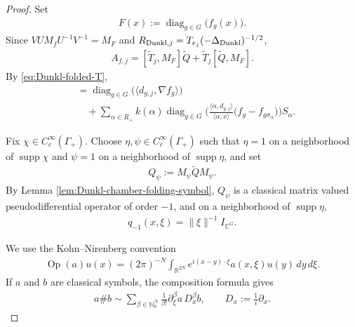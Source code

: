 \documentclass{amsart}
\begin{document}
\begin{proof}
Set
\begin{align*}
F(x)
:=
\operatorname{diag}_{g\in G}\big(f_g(x)\big).
\end{align*}
Since \(VU M_fU^{-1}V^{-1}=M_F\) and
\(R_{{\rm Dunkl},j}=T_{e_j}(-\Delta_{{\rm Dunkl}})^{-1/2}\),
\begin{align}
A_{f,j}
=
[\widetilde T_j,M_F]\widetilde Q
+
\widetilde T_j[\widetilde Q,M_F].
\label{eq:Dunkl-commutator-folded-decomposition}
\end{align}
By \eqref{eq:Dunkl-folded-T},
\begin{align}
[\widetilde T_j,M_F]
&=
\operatorname{diag}_{g\in G}
\big(
\langle d_{g,j},\nabla f_g\rangle
\big)
\nonumber\\
&\quad+
\sum_{\alpha\in R_+}
k(\alpha)
\operatorname{diag}_{g\in G}
\bigg(
\frac{\langle\alpha,d_{g,j}\rangle}
{\langle\alpha,x\rangle}
\big(
f_g-f_{g\sigma_\alpha}
\big)
\bigg)S_\alpha .
\label{eq:Dunkl-TF-folded-commutator}
\end{align}

Fix \(\chi\in C_c^\infty(\Gamma_+)\). Choose
\(\eta,\psi\in C_c^\infty(\Gamma_+)\) such that
\(\eta=1\) on a neighborhood of \(\operatorname{supp}\chi\) and
\(\psi=1\) on a neighborhood of \(\operatorname{supp}\eta\), and set
\begin{align*}
Q_\psi
:=
M_\psi\widetilde Q M_\psi.
\end{align*}
By Lemma \ref{lem:Dunkl-chamber-folding-symbol},
\(Q_\psi\) is a classical matrix valued pseudodifferential operator
of order \(-1\), and on a neighborhood of
\(\operatorname{supp}\eta\),
\begin{align}
q_{-1}(x,\xi)
=
\|\xi\|^{-1}I_{\mathbb C^G}.
\label{eq:Dunkl-Q-qminusone}
\end{align}

We use the Kohn--Nirenberg convention
\begin{align*}
\operatorname{Op}(a)u(x)
=
(2\pi)^{-N}
\int_{\mathbb R^{2N}}
e^{i(x-y)\cdot\xi}
a(x,\xi)u(y)\,dy\,d\xi.
\end{align*}
If \(a\) and \(b\) are classical symbols, the composition formula
\cite[Theorem~18.1.8, p.~71]{MR0781536} gives
\begin{align}
a\# b
\sim
\sum_{\beta\in\mathbb N_0^N}
\frac{1}{\beta!}
\partial_\xi^\beta a\,
D_x^\beta b,
\qquad
D_x:=\frac{1}{i}\partial_x.
\label{eq:KN-composition}
\end{align}


\end{proof}
\end{document}
